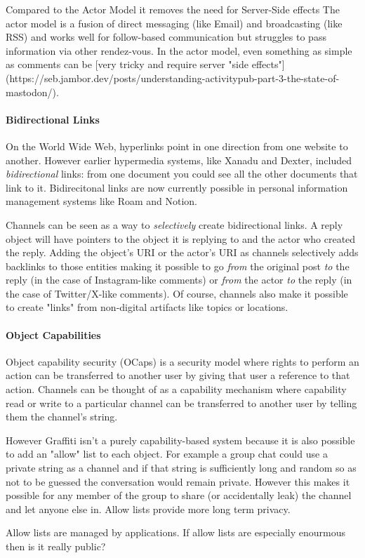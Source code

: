 Compared to the Actor Model it removes the need for Server-Side effects
The actor model is a fusion of direct messaging (like Email) and broadcasting
(like RSS) and works well for follow-based communication but struggles
to pass information via other rendez-vous.
In the actor model, even something as simple as comments can be
[very tricky and require server "side effects"](https://seb.jambor.dev/posts/understanding-activitypub-part-3-the-state-of-mastodon/).

\paragraph{Bidirectional Links}

On the World Wide Web, hyperlinks point in one direction from one website to another.
However earlier hypermedia systems, like Xanadu and Dexter, included \emph{bidirectional} links:
from one document you could see all the other documents that link to it.
Bidirecitonal links are now currently possible in personal information management systems like Roam and Notion.

Channels can be seen as a way to \emph{selectively} create bidirectional links.
A reply object will have pointers to the object it is replying to and the actor who created the reply.
Adding the object's URI or the actor's URI as channels selectively adds backlinks to those entities
making it possible to go \emph{from} the original post \emph{to} the reply (in the case of Instagram-like comments)
or \emph{from} the actor \emph{to} the reply (in the case of Twitter/X-like comments).
Of course, channels also make it possible to create "links" from non-digital artifacts like topics or locations.

\paragraph{Object Capabilities}

Object capability security (OCaps) is a security model where rights to perform an action
can be transferred to another user by giving that user a reference to that action.
Channels can be thought of as a capability mechanism where
capability read or write to a particular channel
can be transferred to another user by telling them the channel's string.

However Graffiti isn't a purely capability-based system because it
is also possible to add an "allow" list to each object.
For example a group chat could use a private string as a channel
and if that string is sufficiently long and random so as not to be guessed
the conversation would remain private.
However this makes it possible for any member of the group to share (or accidentally leak) the
channel and let anyone else in.
Allow lists provide more long term privacy.

Allow lists are managed by applications.
If allow lists are especially enourmous then is it really public?
